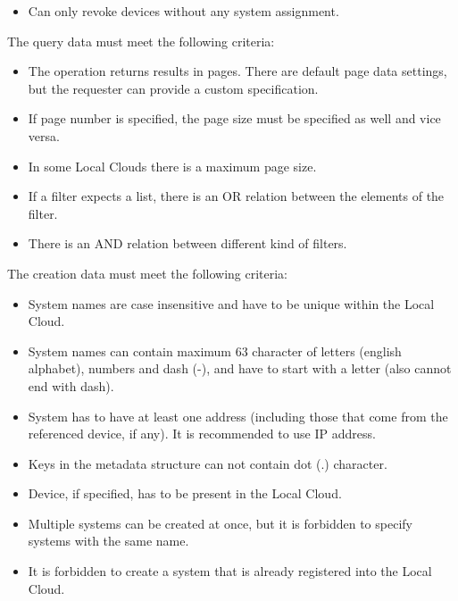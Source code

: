 \documentclass[a4paper]{arrowhead}
\begin{document}
\begin{itemize}
    \item Can only revoke devices without any system assignment.
\end{itemize}


The query data must meet the following criteria:

\begin{itemize}
    \item The operation returns results in pages. There are default page data settings, but the requester can provide a custom specification.
    \item If page number is specified, the page size must be specified as well and vice versa.
    \item In some Local Clouds there is a maximum page size.
    \item If a filter expects a list, there is an OR relation between the elements of the filter.
    \item There is an AND relation between different kind of filters.
\end{itemize}


The creation data must meet the following criteria:

\begin{itemize}
    \item System names are case insensitive and have to be unique within the Local Cloud.
    \item System names can contain maximum 63 character of letters (english alphabet), numbers and dash (-), and have to start with a letter (also cannot end with dash).
    \item System has to have at least one address (including those that come from the referenced device, if any). It is recommended to use IP address. 
    \item Keys in the metadata structure can not contain dot (.) character.
    \item Device, if specified, has to be present in the Local Cloud.
    \item Multiple systems can be created at once, but it is forbidden to specify systems with the same name.
    \item It is forbidden to create a system that is already registered into the Local Cloud.
\end{itemize}
\end{document}
